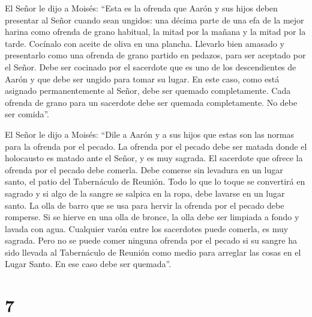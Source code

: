  El Señor le dijo a Moisés:  ``Esta es la
ofrenda que Aarón y sus hijos deben presentar al Señor cuando sean
ungidos: una décima parte de una efa de la mejor harina como ofrenda de
grano habitual, la mitad por la mañana y la mitad por la tarde.
 Cocínalo con aceite de oliva en una plancha. Llevarlo bien
amasado y presentarlo como una ofrenda de grano partido en pedazos, para
ser aceptado por el Señor.  Debe ser cocinado por el
sacerdote que es uno de los descendientes de Aarón y que debe ser ungido
para tomar su lugar. En este caso, como está asignado permanentemente al
Señor, debe ser quemado completamente.  Cada ofrenda de
grano para un sacerdote debe ser quemada completamente. No debe ser
comida''.

 El Señor le dijo a Moisés:  ``Dile a Aarón y
a sus hijos que estas son las normas para la ofrenda por el pecado. La
ofrenda por el pecado debe ser matada donde el holocausto es matado ante
el Señor, y es muy sagrada.  El sacerdote que ofrece la
ofrenda por el pecado debe comerla. Debe comerse sin levadura en un
lugar santo, el patio del Tabernáculo de Reunión.  Todo lo
que lo toque se convertirá en sagrado y si algo de la sangre se salpica
en la ropa, debe lavarse en un lugar santo.  La olla de
barro que se usa para hervir la ofrenda por el pecado debe romperse. Si
se hierve en una olla de bronce, la olla debe ser limpiada a fondo y
lavada con agua.  Cualquier varón entre los sacerdotes
puede comerla, es muy sagrada.  Pero no se puede comer
ninguna ofrenda por el pecado si su sangre ha sido llevada al
Tabernáculo de Reunión como medio para arreglar las cosas en el Lugar
Santo. En ese caso debe ser quemada''.

\hypertarget{section-6}{%
\section{7}\label{section-6}}

